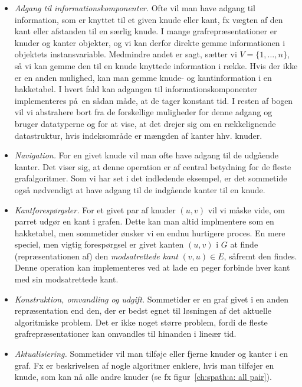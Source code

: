 \begin{itemize}
\item \emph{Adgang til informationskomponenter.} 
  Ofte vil man have adgang til information, som er knyttet til et given knude eller kant,
  fx vægten 
  af den kant eller afstanden til en særlig knude.
  I mange graf\-repræsentationer er knuder og kanter objekter, og vi kan derfor direkte gemme informationen i objektets instansvariable.
  Medmindre andet er sagt, sætter vi $V=\{1,\ldots, n\}$,
  så vi kan gemme den til en knude knyttede information i række.
  Hvis der ikke er en anden mulighed, kan man gemme knude- og kantinformation i en hakketabel.
  I hvert fald kan adgangen til informationskomponenter implementeres på en sådan måde, at de tager konstant tid.
  I resten af bogen vil vi abstrahere bort fra de forskellige muligheder for denne adgang og bruger datatyperne  og 
  for at vise, at det drejer sig om en rækkelignende datastruktur, hvis indeksområde er mængden af kanter hhv. knuder. 
\item \emph{Navigation.} 
  For en givet knude vil man ofte have adgang til de udgående kanter.
  Det viser sig, at denne operation er af central betydning for de fleste grafalgoritmer.
  Som vi har set i det indledende eksempel, er det sommetide også nødvendigt at have adgang til de indgående kanter til en knude.
\item \emph{Kantforespørgsler.}
  For et givet par af knuder $(u,v)$ vil vi måske vide, om parret udgør en kant i grafen. 
  Dette kan man altid implmentere som en hakketabel,
  men sommetider ønsker vi en endnu hurtigere proces.
  En mere speciel, men vigtig forespørgsel er givet kanten $(u,v)$ i $G$ at finde (repræsentationen af) den \emph{modsatrettede kant} 
   $(v,u)\in E$,
  såfremt den findes.
  Denne operation kan implementeres ved at lade en peger forbinde hver kant med sin modsatrettede kant.
\item \emph{Konstruktion, omvandling og udgift.}
%
%
%
%
    Sommetider er en graf givet i en anden repræsentation end den, der er bedst egnet til løsningen af det aktuelle algoritmiske problem.
Det er ikke noget større problem, fordi de fleste graf\-repræsentationer kan omvandles til hinanden i lineær tid.
\item \emph{Aktualisiering.}
  Sommetider vil man tilføje eller fjerne knuder og kanter i en graf.
    Fx er beskrivelsen af nogle algoritmer enklere, hvis man tilføjer en knude, som kan nå alle andre knuder (se fx figur~\ref{ch:spath:a: all pair}). 
\end{itemize}

